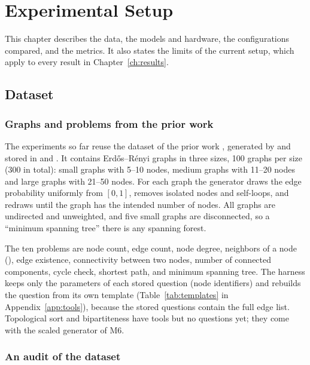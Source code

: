 \chapter{Experimental Setup}
\label{ch:setup}

This chapter describes the data, the models and hardware, the configurations compared, and the metrics. It also
states the limits of the current setup, which apply to every result in Chapter~\ref{ch:results}.

\section{Dataset}

\subsection{Graphs and problems from the prior work}

The experiments so far reuse the dataset of the prior work \cite{skianis2024pseudocode}, generated by
 and stored in  and . It contains
Erd\H{o}s--R\'enyi graphs in three sizes, 100 graphs per size (300 in total): small graphs with 5--10 nodes, medium
graphs with 11--20 nodes and large graphs with 21--50 nodes. For each graph the generator draws the edge probability
uniformly from $[0, 1]$, removes isolated nodes and self-loops, and redraws until the graph has the intended number of
nodes. All graphs are undirected and unweighted, and five small graphs are disconnected, so a ``minimum spanning
tree'' there is any spanning forest.

The ten problems are node count, edge count, node degree, neighbors of a node (), edge
existence, connectivity between two nodes, number of connected components, cycle check, shortest path, and minimum
spanning tree. The harness keeps only the parameters of each stored question (node identifiers) and rebuilds the
question from its own template (Table~\ref{tab:templates} in Appendix~\ref{app:tools}), because the stored questions
contain the full edge list. Topological sort and bipartiteness have tools but no questions yet; they come with the
scaled generator of M6.

\subsection{An audit of the dataset}
\label{sec:audit}

